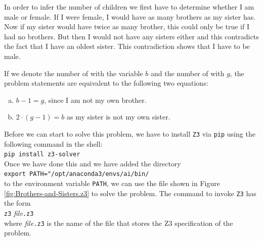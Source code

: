 In order to infer the number of children we first have to determine whether I am male or female.
If I were female, I would have as many brothers as my sister has.  Now if my sister would have twice as many
brother, this could only be true if I had no brothers.  But then I would not have any sisters either and this
contradicts the fact that I have an oldest sister.  This contradiction shows that I have to be male.

If we denote the number of  with the variable $b$ and the number of  with
$g$, the problem statements are equivalent to the following two equations:
\begin{enumerate}[(a)]
\item $b - 1 = g$, \quad since I am not my own brother.
\item $2 \cdot (g - 1) = b$ \quad as my sister is not my own sister.
\end{enumerate}

Before we can start to solve this problem, we have to install \texttt{Z3} via \texttt{pip} using the following
command in the shell:  
\\[0.2cm]
\hspace*{1.3cm}
\texttt{pip install z3-solver}
\\[0.2cm]
Once we have done this and we have added the directory
\\[0.2cm]
\hspace*{1.3cm}
\texttt{export PATH="/opt/anaconda3/envs/ai/bin/}
\\[0.2cm]
to the environment variable \texttt{PATH}, we can use the file shown in Figure
\ref{fig:Brothers-and-Sisters.z3} to solve the problem.  The command to invoke \texttt{Z3} has the form
\\[0.2cm]
\hspace*{1.3cm}
\texttt{z3} \textsl{file}\texttt{.z3}
\\[0.2cm]
where \textsl{file}\texttt{.z3} is the name of the file that stores the Z3 specification of the problem.

